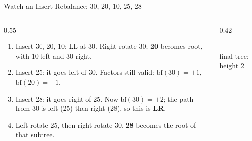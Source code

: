 \documentclass[aspectratio=169]{beamer}
\begin{document}
\begin{frame}{Watch an Insert Rebalance: 30, 20, 10, 25, 28}
  \begin{columns}[T]
    \begin{column}{0.55\textwidth}
      \footnotesize
      \begin{enumerate}
        \item Insert 30, 20, 10: LL at 30. Right-rotate 30; \textbf{20}
          becomes root, with 10 left and 30 right.
        \item Insert 25: it goes left of 30. Factors still valid:
          $\mathrm{bf}(30)=+1$, $\mathrm{bf}(20)=-1$.
        \item Insert 28: it goes right of 25. Now $\mathrm{bf}(30)=+2$;
          the path from 30 is left (25) then right (28), so this is
          \textbf{LR}.
        \item Left-rotate 25, then right-rotate 30. \textbf{28} becomes
          the root of that subtree.
      \end{enumerate}
    \end{column}
    \begin{column}{0.42\textwidth}
      \centering
      \\[-0.1cm]
      {\scriptsize final tree: height 2}
    \end{column}
  \end{columns}
\end{frame}
\end{document}
